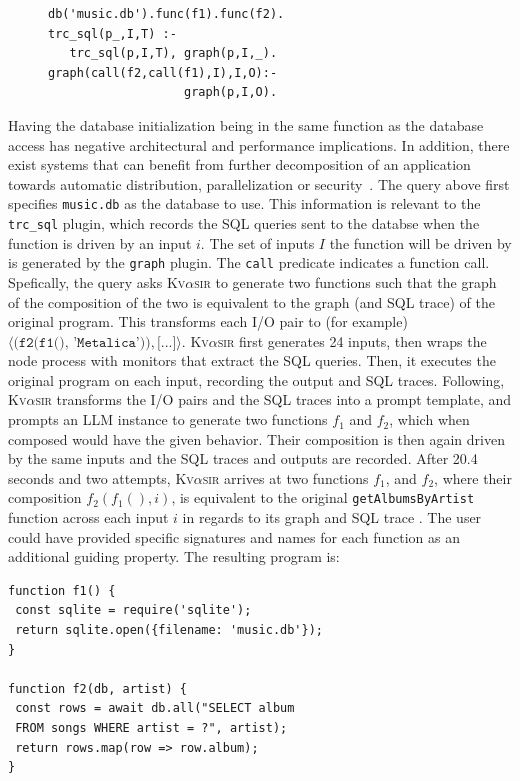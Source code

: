 \documentclass[nonacm,sigplan,review]{acmart}
\newcommand{\sys}{{\scshape Kv{$\alpha$}sir}\xspace}
\newcommand{\ttt}[1]{\texttt{#1}\xspace}
\begin{document}
\begin{figure}
  \begin{verbatim}
db('music.db').func(f1).func(f2).
trc_sql(p_,I,T) :-
   trc_sql(p,I,T), graph(p,I,_).
graph(call(f2,call(f1),I),I,O):-
                   graph(p,I,O).
\end{verbatim}
\end{figure}
Having the database initialization being in the same function as 
the database access has negative architectural and performance implications.
In addition, there exist systems that can benefit from further decomposition
of an application towards automatic distribution, parallelization or security~\cite{Towards_Modern_Ghemaw_2023, vasilakis2019ignis, vasilakis2018breakapp}.
The query above first specifies \ttt{music.db} as the database to use.
This information is relevant to the \ttt{trc\_sql} plugin, which records the SQL queries 
sent to the databse when the function is driven by an input $i$.
The set of inputs $I$ the function will be driven by is generated by the \ttt{graph} plugin.
The \ttt{call} predicate indicates a function call.
Spefically, the query asks \sys to generate two functions such 
that the graph of the composition of the two is equivalent to the graph (and SQL trace) of the original program.
This transforms each I/O pair to (for example) $\langle\ttt{(f2(f1(), 'Metalica'))}, \ttt{[...]}\rangle$.
\sys first generates 24 inputs, then wraps the node process with monitors that extract the SQL queries.
Then, it executes the original program on each input, recording the output and SQL traces.
Following, \sys transforms the I/O pairs and the SQL traces into a prompt template,
and prompts an LLM instance to generate two functions $f_1$ and $f_2$, which when composed would have the given behavior.
Their composition is then again driven by the same inputs and the SQL traces and outputs are recorded.
After 20.4 seconds and two attempts, \sys arrives at two functions $f_1$, and 
$f_2$, where their composition $f_2(f_1(), i)$,
is equivalent to the original \ttt{getAlbumsByArtist} function across each input $i$ in regards to its graph and SQL trace .
The user could have provided specific signatures and names for each 
function as an additional guiding property.
The resulting program is:
\begin{verbatim}
function f1() {
 const sqlite = require('sqlite');
 return sqlite.open({filename: 'music.db'});
}

function f2(db, artist) {
 const rows = await db.all("SELECT album
 FROM songs WHERE artist = ?", artist);
 return rows.map(row => row.album); 
}
\end{verbatim}
\end{document}
